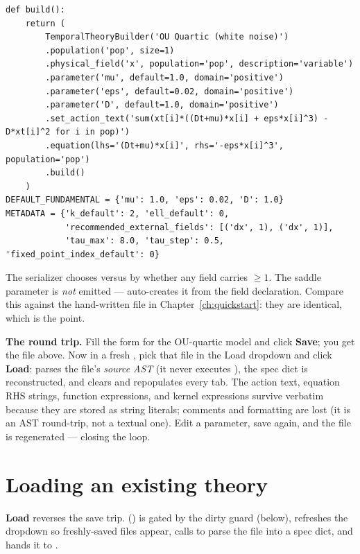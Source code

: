 \begin{lstlisting}
def build():
    return (
        TemporalTheoryBuilder('OU Quartic (white noise)')
        .population('pop', size=1)
        .physical_field('x', population='pop', description='variable')
        .parameter('mu', default=1.0, domain='positive')
        .parameter('eps', default=0.02, domain='positive')
        .parameter('D', default=1.0, domain='positive')
        .set_action_text('sum(xt[i]*((Dt+mu)*x[i] + eps*x[i]^3) - D*xt[i]^2 for i in pop)')
        .equation(lhs='(Dt+mu)*x[i]', rhs='-eps*x[i]^3', population='pop')
        .build()
    )
DEFAULT_FUNDAMENTAL = {'mu': 1.0, 'eps': 0.02, 'D': 1.0}
METADATA = {'k_default': 2, 'ell_default': 0,
            'recommended_external_fields': [('dx', 1), ('dx', 1)],
            'tau_max': 8.0, 'tau_step': 0.5, 'fixed_point_index_default': 0}
\end{lstlisting}

The serializer chooses  versus
 by whether any field carries  $\ge
1$. The saddle parameter  is \emph{not} emitted --- 
auto-creates it from the field declaration. Compare this against the hand-written
file in Chapter~\ref{ch:quickstart}: they are identical, which is the point.

\begin{example}\label{ex:ui-roundtrip}
\textbf{The round trip.} Fill the form for the OU-quartic model and click
\textbf{Save}; you get the file above. Now in a fresh , pick that
file in the Load dropdown and click \textbf{Load}: 
parses the file's \emph{source AST} (it never executes ), the spec
dict is reconstructed, and  clears and repopulates every tab. The
action text, equation RHS strings, function expressions, and kernel expressions
survive verbatim because they are stored as string literals; comments and
formatting are lost (it is an AST round-trip, not a textual one). Edit a parameter,
save again, and the file is regenerated --- closing the loop.
\end{example}

\section{Loading an existing theory}

\textbf{Load} reverses the save trip. 
() is gated by the dirty guard (below), refreshes
the dropdown so freshly-saved files appear, calls  to
parse the file into a spec dict, and hands it to .


